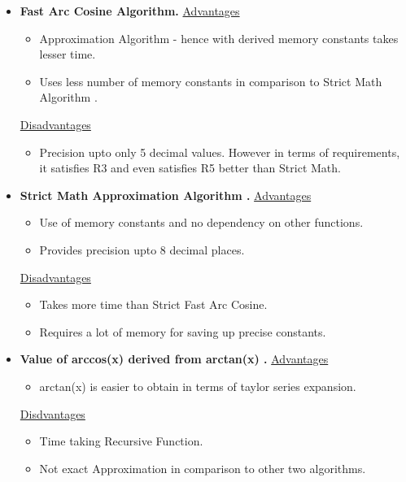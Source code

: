 \documentclass[a4paper,12pt]{article}
\begin{document}
    \begin{itemize}
    \item{\textbf{Fast Arc Cosine Algorithm\cite{Abramowitz Book}.} \newline \underline{Advantages}}
    \begin{itemize} 
        \item {Approximation Algorithm - hence with derived memory constants takes lesser time.}
        \item{Uses less number of memory constants in comparison to Strict Math Algorithm .}
    \end{itemize}
    \underline{Disadvantages}
    \begin{itemize}
        \item {Precision upto only 5 decimal values. However in terms of requirements, it satisfies R3 and even satisfies R5 better than Strict Math.}
    \end{itemize}
    \item{\textbf{Strict Math Approximation Algorithm \cite{Strict Math}.}}
    \newline
    \underline{Advantages}
    \begin{itemize}
        \item {Use of memory constants and no dependency on other functions.}
        \item{Provides precision upto 8 decimal places.}
    \end{itemize}
    \underline{Disadvantages}
    \begin{itemize}
        \item {Takes more time than Strict Fast Arc Cosine.}
        \item{Requires a lot of memory for saving up precise constants.}
    \end{itemize}
    \item{\textbf{Value of arccos(x) derived from arctan(x) \cite{Taylor Series Expansion}.}}
    \newline
    \underline{Advantages}
    \begin{itemize}
        \item {arctan(x) is easier to obtain in terms of taylor series expansion.}
    \end{itemize}
    \underline{Disdvantages}
    \begin{itemize}
        \item {Time taking Recursive Function.}
        \item{Not exact Approximation in comparison to other two algorithms.}
    \end{itemize}
    \end{itemize}
    
\end{document}
